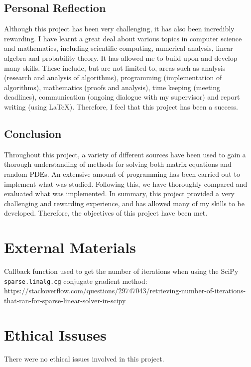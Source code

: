 \documentclass[11pt]{article}
\numberwithin{equation}{section}
\begin{document}
\subsection{Personal Reflection}

Although this project has been very challenging, it has also been incredibly rewarding. I have learnt a great deal about various topics in computer science and mathematics, including scientific computing, numerical analysis, linear algebra and probability theory. It has allowed me to build upon and develop many skills. These include, but are not limited to, areas such as analysis (research and analysis of algorithms), programming (implementation of algorithms), mathematics (proofs and analysis), time keeping (meeting deadlines), communication (ongoing dialogue with my supervisor) and report writing (using \LaTeX). Therefore, I feel that this project has been a success.


\subsection{Conclusion}
Throughout this project, a variety of different sources have been used to gain a thorough understanding of methods for solving both matrix equations and random PDEs. An extensive amount of programming has been carried out to implement what was studied. Following this, we have thoroughly compared and evaluated what was implemented. In summary, this project provided a very challenging and rewarding experience, and has allowed many of my skills to be developed. Therefore, the objectives of this project have been met. 


\newpage




\newpage

\begin{appendices}

\section{External Materials}
Callback function used to get the number of iterations when using the SciPy \texttt{sparse.linalg.cg} conjugate gradient method: https://stackoverflow.com/questions/29747043/retrieving-number-of-iterations-that-ran-for-sparse-linear-solver-in-scipy



\newpage

\section{Ethical Issuses}
There were no ethical issues involved in this project.

\end{appendices}
\end{document}
